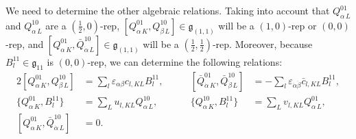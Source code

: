 \documentclass[a4paper,12pt]{article}
\def\nn{\nonumber}
\def\ua{\alpha}
\def\da{\dot{\alpha}}
\def\ub{\beta}
\def\db{\dot{\beta}}
\def\g{\mathfrak{g}}
\def\h{\mathfrak{h}}
\theoremstyle{plain}
\theoremstyle{definition}
\begin{document}

We need to determine the other algebraic relations. Taking into account that $Q^{01}_{\ua\,L}$ and $Q^{10}_{\ua\,L}$ are a $(\frac{1}{2},0)$-rep, $[Q^{01}_{\ua\,K},Q^{10}_{\ub\,L}]\in \g_{(1,1)}$ will be a $(1,0)$-rep or $(0,0)$-rep, and  $[Q^{01}_{\ua\,K},\bar Q^{10}_{\da\,L}]\in \g_{(1,1)}$ will be a $(\frac{1}{2},\frac{1}{2})$-rep. Moreover, because $B^{11}_l \in \g_{11}$ is $(0,0)$-rep, we can determine the following relations: 
\begin{alignat}{2}
 [Q^{01}_{\ua\,K},Q^{10}_{\ub\,L}]&=\sum_l \varepsilon_{\ua\ub} c_{l,KL} B_l^{11},\qquad&
 [\bar Q^{01}_{\da\,K},\bar Q^{10}_{\db\,L}]&=- \sum_l \varepsilon_{\da\db} \bar c_{l,KL} B_l^{11}
,\nn\\
 \{Q^{01}_{\ua\,K},B_l^{11}\}&=\sum_L u_{l,KL}Q^{10}_{\ua\,L},\qquad &
 \{Q^{10}_{\ua\,K},B_l^{11}\}&=\sum_L v_{l,KL}Q^{01}_{\ua\,L}
,\nn\\
 [Q^{01}_{\ua\,K},\bar Q^{10}_{\da\,L}]&=0.
\end{alignat}
\end{document}
